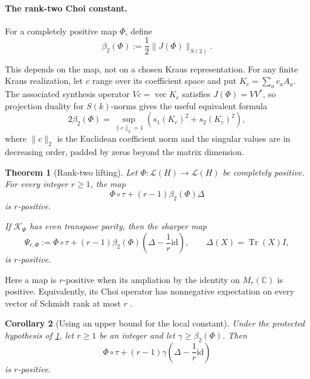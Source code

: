 \documentclass[11pt,reqno]{amsart}
\newtheorem{theorem}{Theorem}[section]
\newtheorem{corollary}[theorem]{Corollary}
\theoremstyle{remark}
\DeclareMathOperator{\Tr}{Tr}
\newcommand{\id}{\mathrm{id}}
\newcommand{\cL}{\mathcal L}
\newcommand{\C}{\mathbb C}
\newcommand{\norm}[1]{\lVert #1\rVert}
\newcommand{\vecop}{\operatorname{vec}}
\begin{document}
\paragraph{The rank-two Choi constant.}
For a completely positive map $\Phi$, define
\begin{equation}
\label{eq:beta}
  \beta_2(\Phi):=\frac12\norm{J(\Phi)}_{S(2)}.
\end{equation}

This depends on the map, not on a chosen Kraus representation.  For any finite
Kraus realization, let $c$ range over its coefficient space and put
$K_c=\sum_a c_aA_a$.  The associated synthesis operator
$Vc=\vecop{K_c}$ satisfies $J(\Phi)=VV^*$, so projection duality for
$S(k)$-norms \cite{JohnstonKribs2010} gives the useful equivalent formula
\begin{equation}
\label{eq:beta-action}
  2\beta_2(\Phi)
  =\sup_{\norm c_2=1}
     \left(s_1(K_c)^2+s_2(K_c)^2\right),
\end{equation}
where $\norm c_2$ is the Euclidean coefficient norm and the singular values
are in decreasing order, padded by zeros beyond the matrix dimension.

\begin{theorem}[Rank-two lifting]
\label{thm:lift}
Let $\Phi:\cL(H)\to\cL(H)$ be completely positive.  For every integer
$r\ge1$, the map
\begin{equation}
\label{eq:unprotected}
  \Phi\circ\tau+(r-1)\beta_2(\Phi)\Delta
\end{equation}
is $r$-positive.

If $\mathcal K_\Phi$ has even transpose parity, then the sharper map
\begin{equation}
\label{eq:psi}
  \Psi_{r,\Phi}
  :=
  \Phi\circ\tau+(r-1)\beta_2(\Phi)
       \left(\Delta-\frac1r\id\right),
  \qquad \Delta(X)=\Tr(X)I,
\end{equation}
is $r$-positive.
\end{theorem}

Here a map is $r$-positive when its ampliation by the identity on
$M_r(\C)$ is positive.  Equivalently, its Choi operator has nonnegative
expectation on every vector of Schmidt rank at most $r$
\cite{Choi1975,JohnstonKribs2010}.

\begin{corollary}[Using an upper bound for the local constant]
\label{cor:beta-upper}
Under the protected hypothesis of \cref{thm:lift}, let $r\ge1$ be an integer
and let $\gamma\ge\beta_2(\Phi)$.  Then
\[
  \Phi\circ\tau+(r-1)\gamma
  \left(\Delta-\frac1r\id\right)
\]
is $r$-positive.
\end{corollary}
\end{document}
